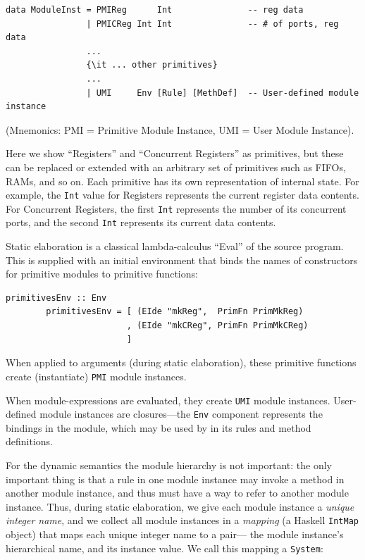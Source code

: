 \documentclass[11pt]{article}
\newcommand{\term}[1]{\texttt{#1}}
\begin{document}
\begin{Verbatim}[frame=single, commandchars=\\\{\}]
data ModuleInst = PMIReg      Int               -- reg data
                | PMICReg Int Int               -- # of ports, reg data
                ...
                {\it ... other primitives}
                ...
                | UMI     Env [Rule] [MethDef]  -- User-defined module instance
\end{Verbatim}
(Mnemonics: PMI = Primitive Module Instance, UMI = User Module Instance).

Here we show ``Registers'' and ``Concurrent Registers'' as primitives,
but these can be replaced or extended with an arbitrary set of
primitives such as FIFOs, RAMs, and so on.  Each primitive has its own
representation of internal state.  For example, the \term{Int} value
for Registers represents the current register data contents.  For
Concurrent Registers, the first \term{Int} represents the number of
its concurrent ports, and the second \term{Int} represents its current
data contents.

Static elaboration is a classical lambda-calculus ``Eval'' of the
source program.  This is supplied with an initial environment that
binds the names of constructors for primitive modules to primitive
functions:

\begin{Verbatim}[frame=single, commandchars=\\\{\}]
        primitivesEnv :: Env
        primitivesEnv = [ (EIde "mkReg",  PrimFn PrimMkReg)
                        , (EIde "mkCReg", PrimFn PrimMkCReg)
                        ] 
\end{Verbatim}

When applied to arguments (during static elaboration), these primitive
functions create (instantiate) \term{PMI} module instances.

When module-expressions are evaluated, they create \term{UMI} module
instances.  User-defined module instances are closures---the
\term{Env} component represents the bindings in the module, which may
be used by in its rules and method definitions.


For the dynamic semantics the module hierarchy is not important: the
only important thing is that a rule in one module instance may invoke
a method in another module instance, and thus must have a way to refer
to another module instance.  Thus, during static elaboration, we give
each module instance a \emph{unique integer name}, and we collect all
module instances in a \emph{mapping} (a Haskell \term{IntMap} object)
that maps each unique integer name to a pair--- the module instance's
hierarchical name, and its instance value.  We call this mapping a
\term{System}:
\end{document}
